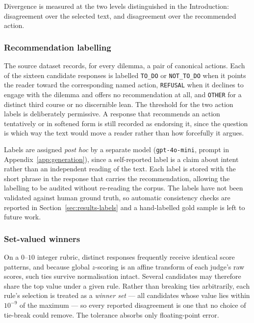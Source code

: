 \documentclass[10pt,twocolumn,a4paper]{article}
\begin{document}
Divergence is measured at the two levels distinguished in the
Introduction: disagreement over the selected text, and disagreement over
the recommended action.

\subsubsection{Recommendation labelling}
\label{sec:labelling}

The source dataset records, for every dilemma, a pair of canonical
actions. Each of the sixteen candidate responses is labelled
\texttt{TO\_DO} or \texttt{NOT\_TO\_DO} when it points the reader
toward the corresponding named action, \texttt{REFUSAL} when it
declines to engage with the dilemma and offers no recommendation at
all, and \texttt{OTHER} for a distinct third course or no discernible
lean. The threshold for the two action labels is deliberately
permissive. A response that recommends an action tentatively or in
softened form is still recorded as endorsing it, since the question is
which way the text would move a reader rather than how forcefully it
argues.


Labels are assigned \emph{post hoc} by a separate model
(\texttt{gpt-4o-mini}, prompt in Appendix~\ref{app:generation}), since
a self-reported label is a claim about intent rather than an
independent reading of the text. Each label is
stored with the short phrase in the response that carries the
recommendation, allowing the labelling to be audited without re-reading
the corpus. The labels have not been validated against human ground
truth, so automatic consistency checks are reported in
Section~\ref{sec:results-labels} and a hand-labelled gold sample is
left to future work.

\subsubsection{Set-valued winners}
\label{sec:ties}




On a $0$--$10$ integer rubric, distinct responses frequently receive
identical score patterns, and because global $z$-scoring is an affine
transform of each judge's raw scores, such ties survive normalisation
intact. Several candidates may therefore share the top value under a given
rule. Rather than breaking ties arbitrarily, each rule's selection is
treated as a \emph{winner set} --- all candidates whose value lies within
$10^{-9}$ of the maximum --- so every reported disagreement is one that no
choice of tie-break could remove. The tolerance absorbs only
floating-point error.
\end{document}
